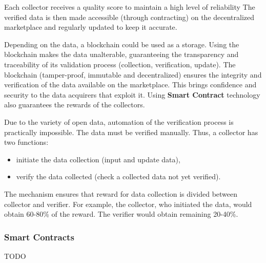 Each collector receives a quality score to maintain a high level of reliability
The verified data is then made accessible (through contracting) on the decentralized marketplace and regularly updated to keep it accurate.

Depending on the data, a blockchain could be used as a storage.
Using the blockchain makes the data unalterable, guaranteeing the transparency and traceability of its validation process (collection, verification, update).
The blockchain (tamper-proof, immutable and decentralized) ensures the integrity and verification of the data available on the marketplace.
This brings confidence and security to the data acquirers that exploit it. 
Using \textbf{Smart Contract} technology also guarantees the rewards of the collectors.

Due to the variety of open data, automation of the verification process is practically impossible.
The data must be verified manually.
Thus, a collector has two functions:
\begin{itemize}
    \item initiate the data collection (input and update data),
    \item verify the data collected (check a collected data not yet verified).
\end{itemize}

The mechanism ensures that reward for data collection is divided between collector and verifier.
For example, the collector, who initiated the data, would obtain 60-80\% of the reward.
The verifier would obtain remaining 20-40\%.

\subsubsection{Smart Contracts}

TODO
